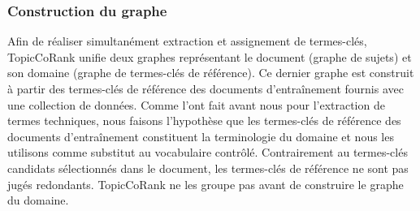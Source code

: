       \subsubsection{Construction du graphe}
      \label{subsubsec:main-domain_specific_keyphrase_annotation-supervised_automatic_keyphrase_extraction-topiccorank-graph_construction}
        Afin de réaliser simultanément extraction et assignement de termes-clés,
        TopicCoRank unifie deux graphes représentant le document (graphe de
        sujets) et son domaine (graphe de termes-clés de référence). Ce dernier
        graphe est construit à partir des termes-clés de référence des documents
        d'entraînement fournis avec une collection de données. Comme
         l'ont fait avant nous
        pour l'extraction de termes techniques, nous faisons l'hypothèse que les
        termes-clés de référence des documents d'entraînement constituent la
        terminologie du domaine et nous les utilisons comme substitut au
        vocabulaire contrôlé. Contrairement au termes-clés candidats
        sélectionnés dans le document, les termes-clés de référence ne sont pas
        jugés redondants. TopicCoRank ne les groupe pas avant de construire le
        graphe du domaine.

